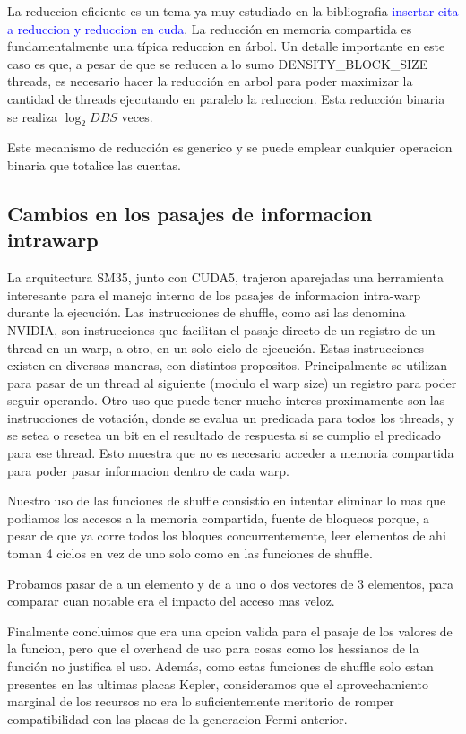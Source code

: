 La reduccion eficiente es un tema ya muy estudiado en la bibliografia \textcolor{blue}{insertar cita a 
reduccion y reduccion en cuda}. La reducci\'on en memoria compartida es fundamentalmente
una t\'ipica reduccion en \'arbol. Un detalle importante en este caso es que, a pesar de que
se reducen a lo sumo DENSITY\_BLOCK\_SIZE threads, es necesario hacer la reducci\'on en arbol
para poder maximizar la cantidad de threads ejecutando en paralelo la reduccion. Esta reducci\'on
binaria se realiza $\log_2{DBS}$ veces.

Este mecanismo de reducci\'on es generico y se puede emplear cualquier operacion binaria que
totalice las cuentas.



\subsection{Cambios en los pasajes de informacion intrawarp}
La arquitectura SM35, junto con CUDA5, trajeron aparejadas una herramienta interesante
para el manejo interno de los pasajes de informacion intra-warp durante la ejecuci\'on.
Las instrucciones de shuffle, como asi las denomina NVIDIA, son instrucciones que facilitan
el pasaje directo de un registro de un thread en un warp, a otro, en un solo ciclo de ejecuci\'on.
Estas instrucciones existen en diversas maneras, con distintos propositos. Principalmente se
utilizan para pasar de un thread al siguiente (modulo el warp size) un registro para poder seguir
operando. Otro uso que puede tener mucho interes proximamente son las instrucciones de votaci\'on,
donde se evalua un predicada para todos los threads, y se setea o resetea un bit en el resultado
de respuesta si se cumplio el predicado para ese thread. Esto muestra que no es necesario
acceder a memoria compartida para poder pasar informacion dentro de cada warp.

Nuestro uso de las funciones de shuffle consistio en intentar eliminar lo mas que podiamos
los accesos a la memoria compartida, fuente de bloqueos porque, a pesar de que ya corre
todos los bloques concurrentemente, leer elementos de ahi toman 4 ciclos en vez de uno solo
como en las funciones de shuffle.

Probamos pasar de a un elemento y de a uno o dos vectores de 3 elementos, para comparar
cuan notable era el impacto del acceso mas veloz.

Finalmente concluimos que era una opcion valida para el pasaje de los valores de la funcion,
pero que el overhead de uso para cosas como los hessianos de la funci\'on no justifica el uso.
Adem\'as, como estas funciones de shuffle solo estan presentes en las ultimas placas Kepler, 
consideramos que el aprovechamiento marginal de los recursos no era lo suficientemente meritorio
de romper compatibilidad con las placas de la generacion Fermi anterior.






